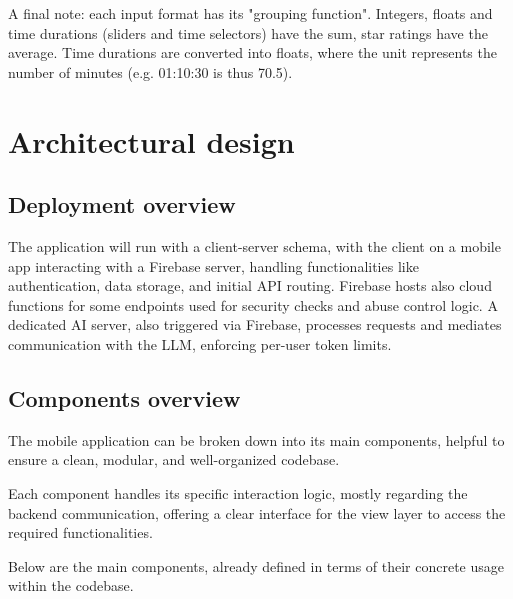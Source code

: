 \documentclass{article}
\begin{document}
A final note: each input format has its "grouping function".
Integers, floats and time durations (sliders and time selectors) have the sum, star ratings have the average.
Time durations are converted into floats, where the unit represents the number of minutes (e.g. 01:10:30 is thus 70.5).

\newpage
\section{Architectural design}

\subsection{Deployment overview}

The application will run with a client-server schema, with the client on a mobile app interacting with a Firebase server, handling functionalities like authentication, data storage, and initial API routing.
Firebase hosts also cloud functions for some endpoints used for security checks and abuse control logic.
A dedicated AI server, also triggered via Firebase, processes requests and mediates communication with the LLM, enforcing per-user token limits.

\subsection{Components overview}

The mobile application can be broken down into its main components, helpful to ensure a clean, modular, and well-organized codebase.

Each component handles its specific interaction logic, mostly regarding the backend communication, offering a clear interface for the view layer to access the required functionalities.

Below are the main components, already defined in terms of their concrete usage within the codebase.
\end{document}
